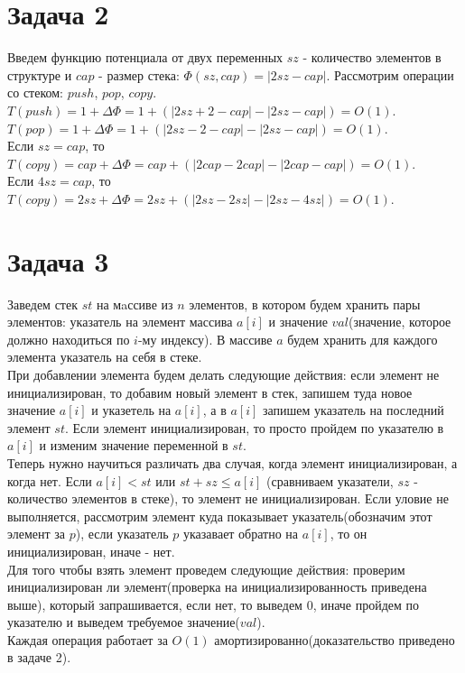\documentclass{article}
\begin{document}
	
	\section*{Задача 2}
	Введем функцию потенциала от двух переменных $sz$ - количество элементов в структуре и $cap$ - размер стека: $\Phi(sz, cap) = |2sz - cap|$. Рассмотрим операции со стеком: $push$, $pop$, $copy$.
	\\
	$T(push) = 1 + \Delta\Phi = 1 + (|2sz + 2 - cap| - |2sz - cap|) = O(1)$.
	\\
	$T(pop) = 1 + \Delta\Phi = 1 + (|2sz - 2 - cap| - |2sz - cap|) = O(1)$.
	\\
	Если $sz = cap$, то $T(copy) = cap + \Delta\Phi = cap + (|2cap - 2cap| - |2cap - cap|) = O(1)$.
	\\
	Если $4sz = cap$, то $T(copy) = 2sz + \Delta\Phi = 2sz + (|2sz - 2sz| - |2sz - 4sz|) = O(1)$.
	
	\section*{Задача 3}
	Заведем стек $st$ на мaссиве из $n$ элементов, в котором будем хранить пары элементов: указатель на элемент массива $a[i]$ и значение $val$(значение, которое должно находиться по $i$-му индексу). В массиве $a$ будем хранить для каждого элемента указатель на себя в стеке.
	\\
	При добавлении элемента будем делать следующие действия: если элемент не инициализирован, то добавим новый элемент в стек, запишем туда новое значение $a[i]$ и указетель на $a[i]$, а в $a[i]$ запишем указатель на последний элемент $st$. Если элемент инициализирован, то просто пройдем по указателю в $a[i]$ и изменим значение переменной в $st$. 
	\\
	Теперь нужно научиться различать два случая, когда элемент инициализирован, а когда нет. Если $a[i] < st$ или $st + sz \le a[i]$ (сравниваем указатели, $sz$ - количество элементов в стеке), то элемент не инициализирован. Если уловие не выполняется, рассмотрим элемент куда показывает указатель(обозначим этот элемент за $p$), если указатель $p$ указавает обратно на $a[i]$, то он инициализирован, иначе - нет.
	\\
	Для того чтобы взять элемент проведем следующие действия: проверим инициализирован ли элемент(проверка на инициализированность приведена выше), который запрашивается, если нет, то выведем $0$, иначе пройдем по указателю и выведем требуемое значение($val$).
	\\
	Каждая операция работает за $O(1)$ амортизированно(доказательство приведено в задаче 2).
	\\
	\\
	\\
	\\
	\\
	\\
	\\
	
\end{document}
